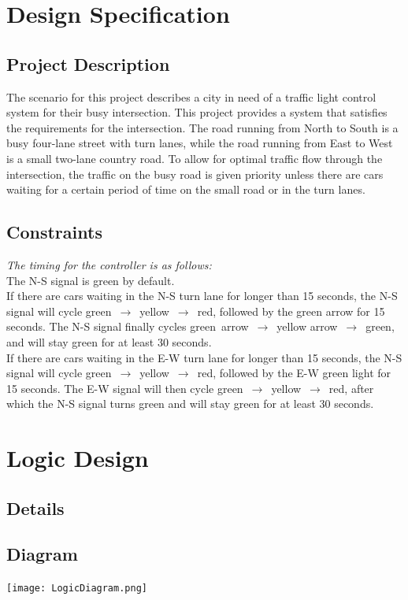 \section{Design Specification}
\subsection{Project Description}
The scenario for this project describes a city in need of a traffic light control system for their busy intersection.
This project provides a system that satisfies the requirements for the intersection. The road running from North to South is a busy four-lane street with turn lanes,
while the road running from East to West is a small two-lane country road. To allow for optimal traffic flow through the intersection,
the traffic on the busy road is given priority unless there are cars waiting for a certain period of time on the small road or in the turn lanes.

\subsection{Constraints}
\emph{The timing for the controller is as follows:}\\[5mm]
The N-S signal is green by default.\\[5mm]
If there are cars waiting in the N-S turn lane for longer than 15 seconds, the N-S signal will cycle green~$\rightarrow$~yellow~$\rightarrow$~red, followed by the green arrow for 15 seconds.
The N-S signal finally cycles green~arrow~$\rightarrow$~yellow arrow~$\rightarrow$~green, and will stay green for at least 30 seconds.\\[5mm]
If there are cars waiting in the E-W turn lane for longer than 15 seconds, the N-S signal will cycle green~$\rightarrow$~yellow~$\rightarrow$~red, followed by the E-W green light for 15 seconds.
The E-W signal will then cycle green~$\rightarrow$~yellow~$\rightarrow$~red, after which the N-S signal turns green and will stay green for at least 30 seconds.

\section{Logic Design}
\subsection{Details}
\subsection{Diagram}
\texttt{[image: LogicDiagram.png]}
\newpage
